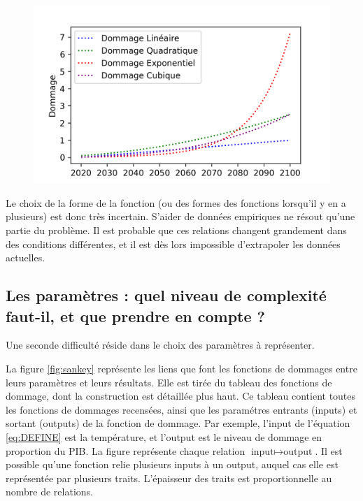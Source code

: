 \begin{figure}[ht]
\centering
\includegraphics[width=\textwidth]{results/shape.png}
\end{figure}


Le choix de la forme de la fonction (ou des formes des fonctions lorsqu'il y en a plusieurs) est donc très incertain. S'aider de données empiriques ne résout qu'une partie du problème. Il est probable que ces relations changent grandement dans des conditions différentes, et il est dès lors impossible d'extrapoler les données actuelles. 

\subsection{Les paramètres : quel niveau de complexité faut-il, et que prendre en compte ?}

Une seconde difficulté réside dans le choix des paramètres à représenter. 

La figure \ref{fig:sankey} représente les liens que font les fonctions de dommages entre leurs paramètres et leurs résultats. Elle est tirée du tableau des fonctions de dommage, dont la construction est détaillée plus haut. Ce tableau contient toutes les fonctions de dommages recensées, ainsi que les paramétres entrants (inputs) et sortant (outputs) de la fonction de dommage. Par exemple, l'input de l'équation \ref{eq:DEFINE} est la température, et l'output est le niveau de dommage en proportion du PIB. La figure représente chaque relation $ \text{input} \mapsto \text{output} $. Il est possible qu'une fonction relie plusieurs inputs à un output, auquel cas elle est représentée par plusieurs traits. L'épaisseur des traits est proportionnelle au nombre de relations.


